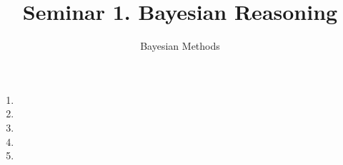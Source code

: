 \documentclass[11pt]{article}
\title{Seminar 1. Bayesian Reasoning}
\author{Bayesian Methods}
\date{}
\begin{document}
\maketitle
\vspace{-2em}

\begin{enumerate}[label=\arabic*., ref=\arabic*]
  \item 
  \item 
  \item 
  \item 
  \item 
\end{enumerate}
\end{document}
